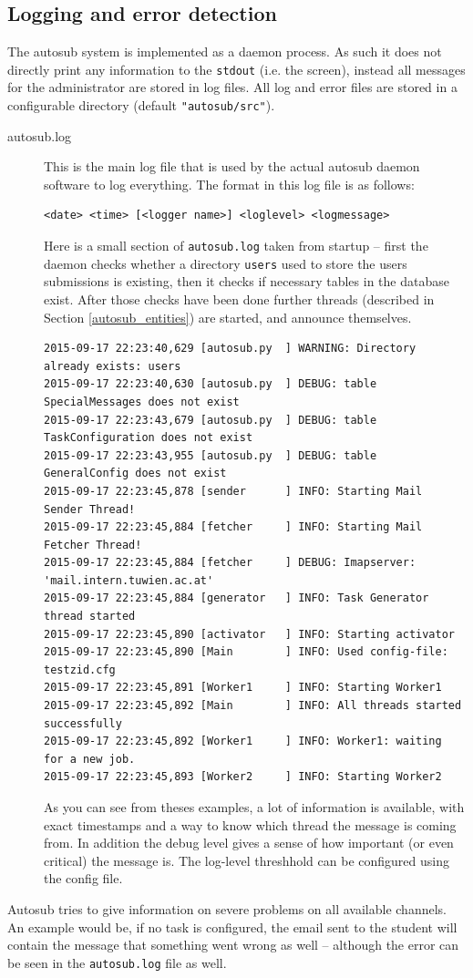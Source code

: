 \subsection{Logging and error detection} \label{logerror}

The autosub system is implemented as a daemon process. As such it does not
directly print any information to the {\tt stdout} (i.e. the screen), instead
all messages for the administrator are stored in log files. All log and error files
are stored in a configurable directory (default {\tt "autosub/src"}).

\begin{description}
\item [autosub.log] This is the main log file that is used by the actual autosub
daemon software to log everything. The format in this log file is as follows:

\begin{verbatim}
<date> <time> [<logger name>] <loglevel> <logmessage>
\end{verbatim}

Here is a small section of {\tt autosub.log} taken from startup -- first the daemon checks
whether a directory {\tt users} used to store the users submissions is existing, then
it checks if necessary tables in the database exist. After those checks have been
done further threads (described in Section \ref{autosub_entities}) are started, and
announce themselves.

{\scriptsize
\begin{verbatim}
2015-09-17 22:23:40,629 [autosub.py  ] WARNING: Directory already exists: users
2015-09-17 22:23:40,630 [autosub.py  ] DEBUG: table SpecialMessages does not exist
2015-09-17 22:23:43,679 [autosub.py  ] DEBUG: table TaskConfiguration does not exist
2015-09-17 22:23:43,955 [autosub.py  ] DEBUG: table GeneralConfig does not exist
2015-09-17 22:23:45,878 [sender      ] INFO: Starting Mail Sender Thread!
2015-09-17 22:23:45,884 [fetcher     ] INFO: Starting Mail Fetcher Thread!
2015-09-17 22:23:45,884 [fetcher     ] DEBUG: Imapserver: 'mail.intern.tuwien.ac.at'
2015-09-17 22:23:45,884 [generator   ] INFO: Task Generator thread started
2015-09-17 22:23:45,890 [activator   ] INFO: Starting activator
2015-09-17 22:23:45,890 [Main        ] INFO: Used config-file: testzid.cfg
2015-09-17 22:23:45,891 [Worker1     ] INFO: Starting Worker1
2015-09-17 22:23:45,892 [Main        ] INFO: All threads started successfully
2015-09-17 22:23:45,892 [Worker1     ] INFO: Worker1: waiting for a new job.
2015-09-17 22:23:45,893 [Worker2     ] INFO: Starting Worker2
\end{verbatim}
}

As you can see from theses examples, a lot of information is available, with
exact timestamps and a way to know which thread the message is coming from.
In addition the debug level gives a sense of how important (or even critical)
the message is. The log-level threshhold can be configured using the config file.

\end{description}

Autosub tries to give information on severe problems on all available channels. An example would be,
if no task is configured, the email sent to the student will contain the message that
something went wrong as well -- although the error can be seen in the {\tt autosub.log}
file as well.

